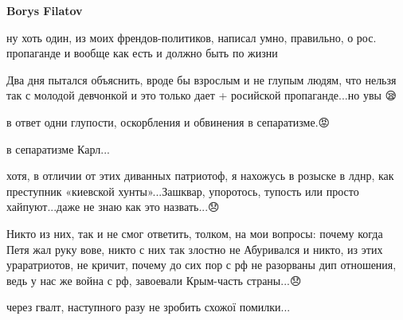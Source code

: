 \begin{itemize}
 
\textbf{Borys Filatov} 

ну хоть один, из моих френдов-политиков, написал умно, правильно, о рос.
пропаганде и вообще как есть и должно быть по жизни🤝

Два дня пытался объяснить, вроде бы взрослым и не глупым людям, что нельзя так с
молодой девчонкой и это только дает + росийской пропаганде...но увы 😪

в ответ одни глупости, оскорбления и обвинения в сепаратизме.😡

в сепаратизме Карл...\Laughey[1.0][white]

хотя, в отличии от этих диванных патриотоф, я нахожусь в розыске в лднр, как
преступник «киевской хунты»...\Laughey[1.0][white]Зашквар, упоротось, тупость или просто хайпуют...даже
не знаю как это назвать...😞

Никто из них, так и не смог ответить, толком, на мои вопросы: почему когда Петя
жал руку вове, никто с них так злостно не Абуривался и никто, из этих
ураратриотов, не кричит, почему до сих пор с рф не разорваны дип отношения, ведь у
нас же война с рф, завоевали Крым-часть страны...😞


 
через гвалт, наступного разу не зробить схожої помилки...

\end{itemize}

